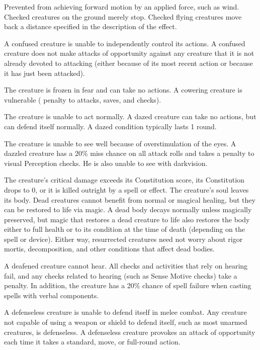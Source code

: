  Prevented from achieving forward motion by an applied force, such as wind. Checked creatures on the ground merely stop. Checked flying creatures move back a distance specified in the description of the effect.

 A confused creature is unable to independently control its actions. \confusionexplanation A confused creature does not make attacks of opportunity against any creature that it is not already devoted to attacking (either because of its most recent action or because it has just been attacked).

 The creature is frozen in fear and can take no actions. A cowering creature is vulnerable ( penalty to attacks, saves, and checks).

 The creature is unable to act normally. A dazed creature can take no actions, but can defend itself normally. A dazed condition typically lasts 1 round.

 The creature is unable to see well because of overstimulation of the eyes. A dazzled creature has a 20\% miss chance on all attack rolls and takes a  penalty to visual Perception checks. He is also unable to see with darkvision.

 The creature's critical damage exceeds its Constitution score, its Constitution drops to 0, or it is killed outright by a spell or effect. The creature's soul leaves its body. Dead creatures cannot benefit from normal or magical healing, but they can be restored to life via magic. A dead body decays normally unless magically preserved, but magic that restores a dead creature to life also restores the body either to full health or to its condition at the time of death (depending on the spell or device). Either way, resurrected creatures need not worry about rigor mortis, decomposition, and other conditions that affect dead bodies.

 A deafened creature cannot hear. All checks and activities that rely on hearing fail, and any checks related to hearing (such as Sense Motive checks) take a  penalty. In addition, the creature has a 20\% chance of spell failure when casting spells with verbal components.

 A defenseless creature is unable to defend itself in melee combat. Any creature not capable of using a weapon or shield to defend itself, such as most unarmed creatures, is defenseless. A defenseless creature provokes an attack of opportunity each time it takes a standard, move, or full-round action.

